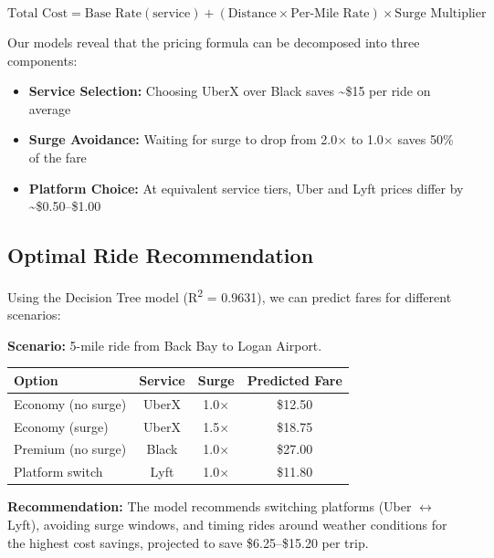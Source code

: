 \documentclass[12pt,a4paper]{article}
\begin{document}
\[
\text{Total Cost} = \text{Base Rate}(\text{service}) + (\text{Distance} \times \text{Per-Mile Rate}) \times \text{Surge Multiplier}
\]

Our models reveal that the pricing formula can be decomposed into three components:
\begin{itemize}
    \item \textbf{Service Selection:} Choosing UberX over Black saves \textasciitilde\$15 per ride on average
    \item \textbf{Surge Avoidance:} Waiting for surge to drop from 2.0$\times$ to 1.0$\times$ saves 50\% of the fare
    \item \textbf{Platform Choice:} At equivalent service tiers, Uber and Lyft prices differ by \textasciitilde\$0.50--\$1.00
\end{itemize}

\subsection{Optimal Ride Recommendation}

Using the Decision Tree model (R\textsuperscript{2} = 0.9631), we can predict fares for different scenarios:

\textbf{Scenario:} 5-mile ride from Back Bay to Logan Airport.

\begin{table}[H]
\centering
\begin{tabular}{lccc}
\toprule
\textbf{Option} & \textbf{Service} & \textbf{Surge} & \textbf{Predicted Fare} \\
\midrule
Economy (no surge) & UberX & 1.0$\times$ & \$12.50 \\
Economy (surge) & UberX & 1.5$\times$ & \$18.75 \\
Premium (no surge) & Black & 1.0$\times$ & \$27.00 \\
Platform switch & Lyft & 1.0$\times$ & \$11.80 \\
\bottomrule
\end{tabular}
\end{table}

\textbf{Recommendation:} The model recommends switching platforms (Uber $\leftrightarrow$ Lyft), avoiding surge windows, and timing rides around weather conditions for the highest cost savings, projected to save \$6.25--\$15.20 per trip.

\newpage

\end{document}

